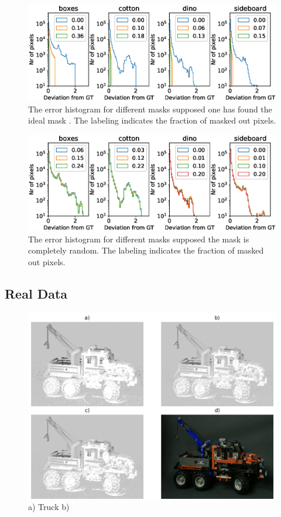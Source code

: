 \documentclass  [
  paper    = a4,
  BCOR     = 10mm,
  twoside,
  fontsize = 12pt,
  fleqn,
  toc      = bibnumbered,
  toc      = listofnumbered,
  numbers  = noendperiod,
  headings = normal,
  listof   = leveldown,
  version  = 3.03
]                                       {scrreprt}
\begin{document}
\begin{appendix}
  	\begin{figure}
  		\centering
  		\includegraphics[width=1\linewidth]{images/histogram_error_mask_perfect}
  		\caption[Histogram when masking errors with new error map]{The error histogram for different masks supposed one has found the ideal mask . The labeling indicates the fraction of masked out pixels.}
  		\label{fig:histogramerrormaskperfect}
  	\end{figure}
  
   	\begin{figure}
  	\centering
  	\includegraphics[width=1\linewidth]{images/histogram_error_mask_random}
  	\caption[Histogram when masking errors with new error map]{The error histogram for different masks supposed the mask is completely random. The labeling indicates the fraction of masked out pixels.}
  	\label{fig:histogramerrormaskrandom}
  \end{figure}
\subsection{Real Data}
\begin{figure}
	\centering
	\includegraphics[width=1\linewidth]{images/truck_realdata}
	\caption[Truck with iterative SGM]{a) Truck b)}
	\label{fig:truckrealdata}
\end{figure}

\end{appendix}
\end{document}
